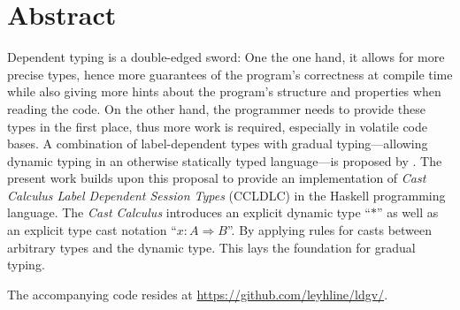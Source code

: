 \chapter*{Abstract}

Dependent typing is a double-edged sword: One the one hand, it allows for more precise types, hence more guarantees of the program's correctness at compile time while also giving more hints about the program's structure and properties when reading the code. On the other hand, the programmer needs to provide these types in the first place, thus more work is required, especially in volatile code bases. A combination of label-dependent types with gradual typing---allowing dynamic typing in an otherwise statically typed language---is proposed by \cite{fu2021}. The present work builds upon this proposal to provide an implementation of \emph{Cast Calculus Label Dependent Session Types} (CCLDLC) in the Haskell programming language. The \emph{Cast Calculus} introduces an explicit dynamic type ``$\ast$'' as well as an explicit type cast notation ``$x : A \Rightarrow B$''. By applying rules for casts between arbitrary types and the dynamic type. This lays the foundation for gradual typing.

The accompanying code resides at \url{https://github.com/leyhline/ldgv/}. 
